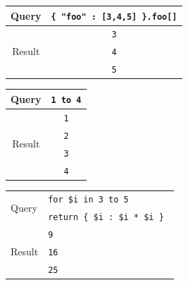 \vspace{1\baselineskip}

\noindent
\begin{minipage}{0.4\textwidth}
\begin{center}
    \begin{tabular}{|c|c|}
        \hline
        Query & \texttt{\{ "foo" : [3,4,5] \}.foo[]} \\ \hline
        \multirow{3}{*}{Result} & \texttt{3} \\
         & \texttt{4} \\
         & \texttt{5} \\ \hline
    \end{tabular}
\end{center}
\end{minipage}
\begin{minipage}{0.2\textwidth}
\begin{center}
    \begin{tabular}{|c|c|}
        \hline
        Query & \texttt{1 to 4} \\ \hline
        \multirow{4}{*}{Result} & \texttt{1} \\
            & \texttt{2} \\
            & \texttt{3} \\
            & \texttt{4} \\ \hline
    \end{tabular}
\end{center}
\end{minipage}
\begin{minipage}{0.4\textwidth}
\begin{center}
    \begin{tabular}{|l|l|}
        \hline
        \multirow{2}{*}{Query} & \texttt{for \$i in 3 to 5} \\
         & \texttt{return \{ \$i : \$i * \$i \} } \\ \hline
        \multirow{3}{*}{Result} & \texttt{9} \\
            & \texttt{16} \\
            & \texttt{25} \\ \hline
    \end{tabular}
\end{center}
\end{minipage}

\vspace{1\baselineskip}

